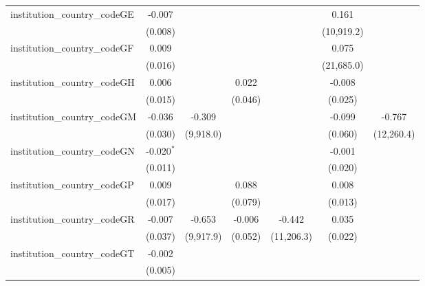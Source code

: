 \begin{tabular}{lcccccc}
   institution\_country\_codeGE          & -0.007         &               &               &              & 0.161        &   \\   
                                         & (0.008)        &               &               &              & (10,919.2)   &   \\   
   institution\_country\_codeGF          & 0.009          &               &               &              & 0.075        &   \\   
                                         & (0.016)        &               &               &              & (21,685.0)   &   \\   
   institution\_country\_codeGH          & 0.006          &               & 0.022         &              & -0.008       &   \\   
                                         & (0.015)        &               & (0.046)       &              & (0.025)      &   \\   
   institution\_country\_codeGM          & -0.036         & -0.309        &               &              & -0.099       & -0.767\\   
                                         & (0.030)        & (9,918.0)     &               &              & (0.060)      & (12,260.4)\\   
   institution\_country\_codeGN          & -0.020$^{*}$   &               &               &              & -0.001       &   \\   
                                         & (0.011)        &               &               &              & (0.020)      &   \\   
   institution\_country\_codeGP          & 0.009          &               & 0.088         &              & 0.008        &   \\   
                                         & (0.017)        &               & (0.079)       &              & (0.013)      &   \\   
   institution\_country\_codeGR          & -0.007         & -0.653        & -0.006        & -0.442       & 0.035        &   \\   
                                         & (0.037)        & (9,917.9)     & (0.052)       & (11,206.3)   & (0.022)      &   \\   
   institution\_country\_codeGT          & -0.002         &               &               &              &              &   \\   
                                         & (0.005)        &               &               &              &              &   \\   

\end{tabular}
